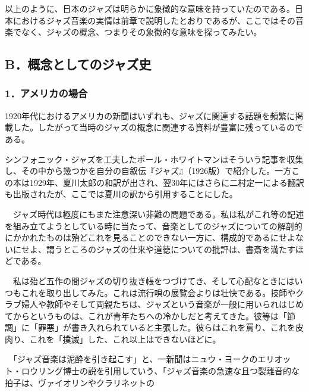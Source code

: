 以上のように、日本のジャズは明らかに象徴的な意味を持っていたのである。日本におけるジャズ音楽の実情は前章で説明したとおりであるが、ここではその音楽でなく、ジャズの概念、つまりその象徴的な意味を探ってみたい。

\subsection{B．概念としてのジャズ史}

\subsubsection{1．アメリカの場合}

1920年代におけるアメリカの新聞はいずれも、ジャズに関連する話題を頻繁に掲載した。したがって当時のジャズの概念に関連する資料が豊富に残っているのである。

シンフォニック・ジャズを工夫したポール・ホワイトマンはそういう記事を収集し、その中から幾つかを自分の自叙伝『ジャズ』（1926版）で紹介した。一方この本は1929年、夏川太郎の和訳が出され、翌30年にはさらに二村定一による翻訳も出版されたが、ここでは夏川の訳から引用することにした。

\begin{gquote}
　ジャズ時代は極度にもまた注意深い非難の問題である。私は私がこれ等の記述を組み立てようとしている時に当たって、音楽としてのジャズについての解剖的にかかれたものは殆どこれを見ることのできない一方に、構成的であるにせよないにせよ、謂うところのジャズの仕来や道徳についての批評は、書斎を満たすほどである。\par{}　私は殆ど五作の間ジャズの切り抜き帳をつづけてき、そして心配なときにはいつもこれを取り出してみた。これは流行唄の展覧会よりは壮快である。技師やクラブ婦人や教師やそして両親たちは、ジャズという音楽が一般に用いられはじめてからというものは、これが青年たちへの冷かしだと考えてきた。彼等は「節調」に「罪悪」が書き入れられていると主張した。彼らはこれを罵り、これを皮肉り、これを「撲滅」した、これ以上はできないほどに。\par{}　「ジャズ音楽は泥酔を引き起こす」と、一新聞はニュウ・ヨークのエリオット・ロウリング博士の説を引用していう、「ジャズ音楽の急速な且つ裂離音的な拍子は、ヴァイオリンやクラリネットの
\end{gquote}


